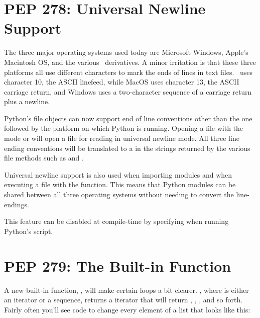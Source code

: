 \documentclass{howto}
\begin{document}
\section{PEP 278: Universal Newline Support}

The three major operating systems used today are Microsoft Windows,
Apple's Macintosh OS, and the various \UNIX\ derivatives.  A minor
irritation is that these three platforms all use different characters
to mark the ends of lines in text files.  \UNIX\ uses character 10,
the ASCII linefeed, while MacOS uses character 13, the ASCII carriage
return, and Windows uses a two-character sequence of a carriage return
plus a newline.

Python's file objects can now support end of line conventions other
than the one followed by the platform on which Python is running.
Opening a file with the mode  or  will open a file
for reading in universal newline mode.  All three line ending
conventions will be translated to a  in the strings
returned by the various file methods such as  and
.

Universal newline support is also used when importing modules and when
executing a file with the  function.  This means
that Python modules can be shared between all three operating systems
without needing to convert the line-endings.

This feature can be disabled at compile-time by specifying
 when running Python's
 script.

\begin{seealso}


\end{seealso}


\section{PEP 279: The  Built-in Function\label{section-enumerate}}

A new built-in function, , will make
certain loops a bit clearer.  , where
 is either an iterator or a sequence, returns a iterator
that will return , , , and so forth.  Fairly
often you'll see code to change every element of a list that looks
like this:
\end{document}
